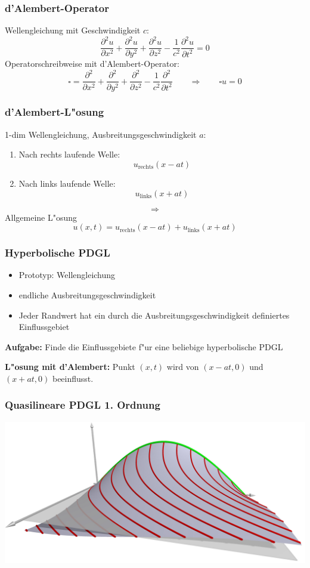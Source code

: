 \documentclass{beamer}
\begin{document}
\begin{frame}
\frametitle{d'Alembert-Operator}
Wellengleichung mit Geschwindigkeit $c$:
\[
\frac{\partial^2u}{\partial x^2}
+
\frac{\partial^2u}{\partial y^2}
+
\frac{\partial^2u}{\partial z^2}
-
\frac1{c^2}
\frac{\partial^2u}{\partial t^2}
=
0
\]
Operatorschreibweise mit d'Alembert-Operator:
\[
\square 
=
\frac{\partial^2}{\partial x^2}
+
\frac{\partial^2}{\partial y^2}
+
\frac{\partial^2}{\partial z^2}
-
\frac1{c^2}
\frac{\partial^2}{\partial t^2}
\qquad
\Rightarrow
\qquad
\square u=0
\]
\end{frame}

\begin{frame}
\frametitle{d'Alembert-L"osung}
1-dim Wellengleichung, Ausbreitungsgeschwindigkeit $a$:
\begin{enumerate}
\item
Nach rechts laufende Welle:
\[
u_{\text{rechts}}(x-at)
\]
\item
Nach links laufende Welle:
\[
u_{\text{links}}(x+at)
\]
\end{enumerate}
\pause
\[
\Rightarrow
\]
Allgemeine L"osung
\[
u(x,t)
=
u_{\text{rechts}}(x-at)
+
u_{\text{links}}(x+at)
\]
\end{frame}


\begin{frame}
\frametitle{Hyperbolische PDGL}

\begin{itemize}[<+->]
\item
Prototyp: Wellengleichung
\item
endliche Ausbreitungsgeschwindigkeit
\item
Jeder Randwert hat ein durch die Ausbreitungsgeschwindigkeit
definiertes Einflussgebiet
\end{itemize}
\pause
\bigskip

{\bf Aufgabe:}
Finde die Einflussgebiete f"ur eine beliebige hyperbolische PDGL
\bigskip

\pause
{\bf L"osung mit d'Alembert:}
Punkt $(x,t)$ wird von $(x-at,0)$ und $(x+at,0)$ beeinflusst.

\end{frame}

\begin{frame}
\frametitle{Quasilineare PDGL 1. Ordnung}
\begin{center}
\includegraphics[width=\hsize]{../../skript/3d/sol.jpg}
\end{center}
\end{frame}
\end{document}
